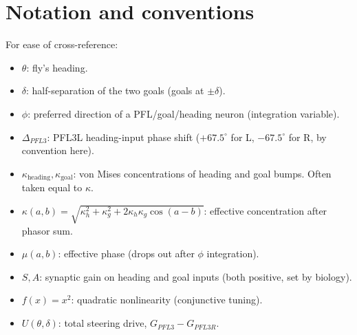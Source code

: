 \documentclass[11pt]{article}
\begin{document}
\section*{Notation and conventions}

For ease of cross-reference:

\begin{itemize}
\item $\theta$: fly's heading.
\item $\delta$: half-separation of the two goals (goals at $\pm\delta$).
\item $\phi$: preferred direction of a PFL/goal/heading neuron (integration variable).
\item $\Delta_{PFL3}$: PFL3L heading-input phase shift ($+67.5^\circ$ for L, $-67.5^\circ$ for R, by convention here).
\item $\kappa_{\text{heading}}, \kappa_{\text{goal}}$: von Mises concentrations of heading and goal bumps. Often taken equal to $\kappa$.
\item $\kappa(a, b) = \sqrt{\kappa_h^2 + \kappa_g^2 + 2\kappa_h\kappa_g\cos(a-b)}$: effective concentration after phasor sum.
\item $\mu(a, b)$: effective phase (drops out after $\phi$ integration).
\item $S, A$: synaptic gain on heading and goal inputs (both positive, set by biology).
\item $f(x) = x^2$: quadratic nonlinearity (conjunctive tuning).
\item $U(\theta, \delta)$: total steering drive, $G_{PFL3} - G_{PFL3R}$.
\end{itemize}



\end{document}
